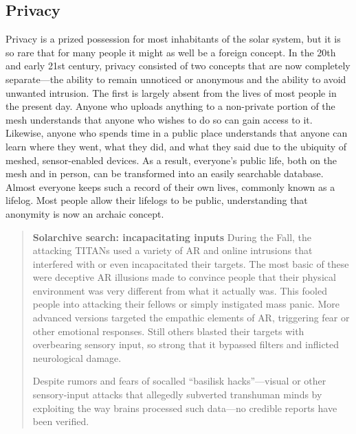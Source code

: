 \subsection{Privacy}
\label{sec:privacy} 

Privacy is a prized possession for most inhabitants of the solar system, but it is so rare that for many people it might as well be a foreign concept. In the 20th and early 21st century, privacy consisted of two concepts that are now completely separate—the ability to remain unnoticed or anonymous and the ability to avoid unwanted intrusion. The first is largely absent from the lives of most people in the present day. Anyone who uploads anything to a non-private portion of the mesh understands that anyone who wishes to do so can gain access to it. Likewise, anyone who spends time in a public place understands that anyone can learn where they went, what they did, and what they said due to the ubiquity of meshed, sensor-enabled devices. As a result, everyone's public life, both on the mesh and in person, can be transformed into an easily searchable database. Almost everyone keeps such a record of their own lives, commonly known as a lifelog. Most people allow their lifelogs to be public, understanding that anonymity is now an archaic concept. 

\begin{quotation}
\textbf{Solarchive search: incapacitating inputs}  During the Fall, the attacking TITANs used a variety of AR and online intrusions that interfered with or even incapacitated their targets. The most basic of these were deceptive AR illusions made to convince people that their physical environment was very different from what it actually was. This fooled people into attacking their fellows or simply instigated mass panic. More advanced versions targeted the empathic elements of AR, triggering fear or other emotional responses. Still others blasted their targets with overbearing sensory input, so strong that it bypassed filters and inflicted neurological damage. 

 Despite rumors and fears of socalled “basilisk hacks”—visual or other sensory-input attacks that allegedly subverted transhuman minds by exploiting the way brains processed such data—no credible reports have been verified.
\end{quotation} 


